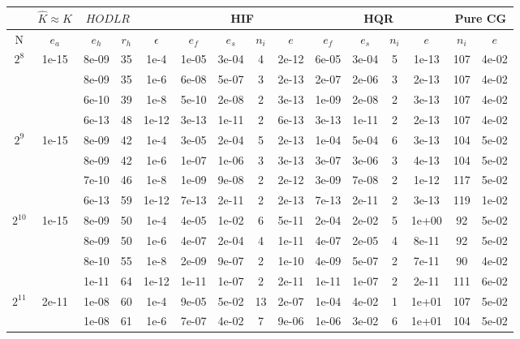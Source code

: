 \documentclass[11pt]{article}
\begin{document}
\begin{table}[!htbp]
\centering
\begin{tabular}{|c|c|c|c|c|c|c|c|c|c|c|c|c|c|c|}
\hline
\multicolumn{1}{c|}{} & \multicolumn{1}{c|}{$\hat{K} \approx K$} & \multicolumn{2}{c|}{$HODLR$} & \multicolumn{1}{c|}{} &\multicolumn{4}{c|}{HIF} & \multicolumn{4}{c|}{HQR} & \multicolumn{2}{c|}{Pure CG} \\
\hline
N & $e_{a}$ & $e_{h}$ & $r_{h}$ & $\epsilon$ & $e_{f}$ & $e_{s}$ & $n_{i}$ & $e$ & $e_{f}$  & $e_{s}$ & $n_{i}$ & $e$ &  $n_{i}$ & $e$ \\ 
\hline
$2^{8}$ & 1e-15 & 8e-09 & 35 & 1e-4 & 1e-05 & 3e-04 & 4 & 2e-12 & 6e-05 & 3e-04 & 5 & 1e-13 & 107 & 4e-02\\
~ & ~ & 8e-09 & 35 & 1e-6 & 6e-08 & 5e-07 & 3 & 2e-13 & 2e-07 & 2e-06 & 3 & 2e-13 & 107 & 4e-02\\
~ & ~ & 6e-10 & 39 & 1e-8 & 5e-10 & 2e-08 & 2 & 3e-13 & 1e-09 & 2e-08 & 2 & 3e-13 & 107 & 4e-02\\
~ & ~ & 6e-13 & 48 & 1e-12 & 3e-13 & 1e-11 & 2 & 6e-13 & 3e-13 & 1e-11 & 2 & 2e-13 & 107 & 4e-02\\
\hline
$2^{9}$ & 1e-15 & 8e-09 & 42 & 1e-4 & 3e-05 & 2e-04 & 5 & 2e-13 & 1e-04 & 5e-04 & 6 & 3e-13 & 104 & 5e-02\\
~ & ~ & 8e-09 & 42 & 1e-6 & 1e-07 & 1e-06 & 3 & 3e-13 & 3e-07 & 3e-06 & 3 & 4e-13 & 104 & 5e-02\\
~ & ~ & 7e-10 & 46 & 1e-8 & 1e-09 & 9e-08 & 2 & 2e-12 & 3e-09 & 7e-08 & 2 & 1e-12 & 117 & 5e-02\\
~ & ~ & 6e-13 & 59 & 1e-12 & 7e-13 & 2e-11 & 2 & 2e-13 & 7e-13 & 2e-11 & 2 & 3e-13 & 119 & 1e-02\\
\hline
$2^{10}$ & 1e-15 & 8e-09 & 50 & 1e-4 & 4e-05 & 1e-02 & 6 & 5e-11 & 2e-04 & 2e-02 & 5 & 1e+00 & 92 & 5e-02\\
~ & ~ & 8e-09 & 50 & 1e-6 & 4e-07 & 2e-04 & 4 & 1e-11 & 4e-07 & 2e-05 & 4 & 8e-11 & 92 & 5e-02\\
~ & ~ & 8e-10 & 55 & 1e-8 & 2e-09 & 9e-07 & 2 & 1e-10 & 4e-09 & 5e-07 & 2 & 7e-11 & 90 & 4e-02\\
~ & ~ & 1e-11 & 64 & 1e-12 & 1e-11 & 1e-07 & 2 & 2e-11 & 1e-11 & 1e-07 & 2 & 2e-11 & 111 & 6e-02\\
\hline
$2^{11}$ & 2e-11 & 1e-08 & 60 & 1e-4 & 9e-05 & 5e-02 & 13 & 2e-07 & 1e-04 & 4e-02 & 1 & 1e+01 & 107 & 5e-02\\
~ & ~ & 1e-08 & 61 & 1e-6 & 7e-07 & 4e-02 & 7 & 9e-06 & 1e-06 & 3e-02 & 6 & 1e+01 & 104 & 5e-02\\

\end{tabular}
\end{table}
\end{document}
